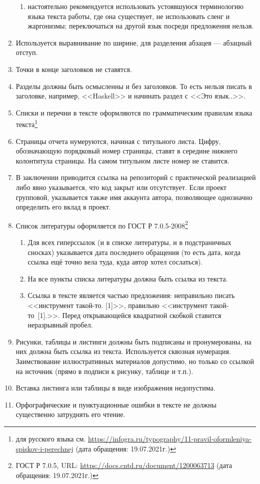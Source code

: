 \documentclass{article}
\begin{document}
\begin{enumerate}
\begin{enumerate}
        \item настоятельно рекомендуется использовать устоявшуюся терминологию языка текста работы, где она существует, не использовать сленг и жаргонизмы; переключаться на другой язык посреди предложения нельзя.
    \end{enumerate}
    \item Используется выравнивание по ширине, для разделения абзацев --- абзацный отступ.
    \item Точки в конце заголовков не ставятся.
    \item Разделы должны быть осмысленны и без заголовков. То есть нельзя писать в заголовке, например, <<Haskell>> и начинать раздел с <<Это язык..>>.
    \item Списки и перечни в тексте оформляются по грамматическим правилам языка текста\footnote{для русского языка см. \url{https://infogra.ru/typography/11-pravil-oformleniya-spiskov-i-perechnej} (дата обращения: 19.07.2021г.)}
    \item Страницы отчета нумеруются, начиная с титульного листа. Цифру, обозначающую порядковый номер страницы, ставят в середине нижнего колонтитула страницы. На самом титульном листе номер не ставится.
    \item В заключении приводится ссылка на репозиторий с практической реализацией либо явно указывается, что код закрыт или отсутствует. Если проект групповой, указывается также имя аккаунта автора, позволяющее однозначно определить его вклад в проект.
    \item Список литературы оформляется по ГОСТ Р 7.0.5-2008\footnote{ГОСТ Р 7.0.5, URL: \url{https://docs.cntd.ru/document/1200063713} (дата обращения: 19.07.2021г.)}
    \begin{enumerate}
        \item Для всех гиперссылок (и в списке литературы, и в подстраничных сносках) указывается дата последнего обращения (то есть дата, когда ссылка ещё точно вела туда, куда автор хотел сослаться).
        \item На все пункты списка литературы должна быть ссылка из текста.
        \item Ссылка в тексте является частью предложения: неправильно писать <<инструмент такой-то. [1]>>, правильно <<инструмент такой-то~[1].>>. Перед открывающейся квадратной скобкой ставится неразрывный пробел.
    \end{enumerate}
    \item Рисунки, таблицы и листинги должны быть подписаны и пронумерованы, на них должна быть ссылка из текста. Используется сквозная нумерация. Заимствование иллюстративных материалов допустимо, но только со ссылкой на источник (прямо в подписи к рисунку, таблице и т.п.).
    \item Вставка листинга или таблицы в виде изображения недопустима.
    \item Орфографические и пунктуационные ошибки в тексте не должны существенно затруднять его чтение.
\end{enumerate}
\end{document}
